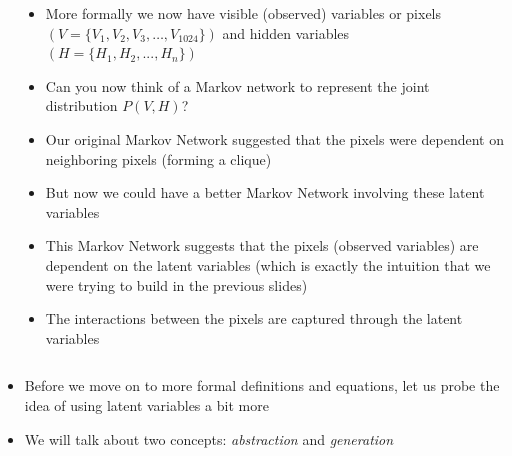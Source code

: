 \begin{frame}[shrink=5]
\begin{columns}
\begin{overlayarea}{\textwidth}{\textheight}
{\begin{center}
	        \end{center}
	        }
		\end{overlayarea}
		\begin{overlayarea}{\textwidth}{\textheight}
			\begin{itemize}\justifying
				\item<1-> More formally we now have visible (observed) variables or pixels $(V = \{V_1, V_2, V_3, \dots, V_{1024}\})$ and hidden variables $(H = \{H_1, H_2, ..., H_n\})$
				\item<2-> Can you now think of a Markov network to represent the joint distribution $P(V, H)$?
				\item<3->  Our original Markov Network suggested that the pixels were dependent on neighboring pixels (forming a clique)
				\item<4-> But now we could have a better Markov Network involving these latent variables
				\item<5-> This Markov Network suggests that the pixels (observed variables) are dependent on the latent variables (which is exactly the intuition that we were trying to build in the previous slides)
				\item<6-> The interactions between the pixels are captured through the latent variables
			\end{itemize}
		\end{overlayarea}
	\end{columns}
\end{frame}



\begin{frame}
\begin{block}{}
\begin{itemize}\justifying
\item<1-> Before we move on to more formal definitions and equations, let us probe the idea of using latent variables a bit more
\item<2-> We will talk about two concepts: \textit{abstraction} and \textit{generation}
 \end{itemize}
\end{block}
\end{frame}

